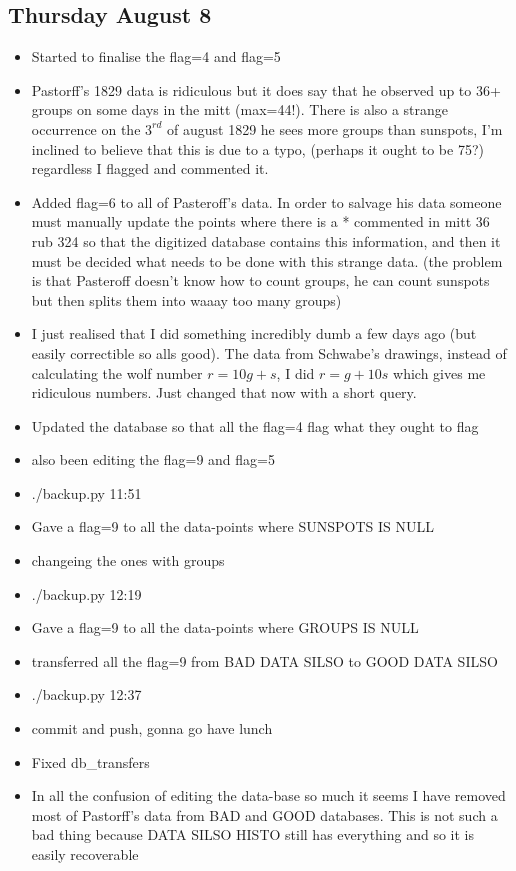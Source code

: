 \documentclass[12pt]{article}
\begin{document}
\subsection{Thursday August 8}
\begin{itemize}
    \item Started to finalise the flag=4 and flag=5
    \item Pastorff's 1829 data is ridiculous but it does say that he observed up to 36+ groups on some days in the mitt (max=44!). There is also a strange occurrence on the $3^{rd}$ of august 1829 he sees more groups than sunspots, I'm inclined to believe that this is due to a typo, (perhaps it ought to be 75?) regardless I flagged and commented it.
    \item Added flag=6 to all of Pasteroff's data. In order to salvage his data someone must manually update the points where there is a * commented in mitt 36 rub 324 so that the digitized database contains this information, and then it must be decided what needs to be done with this strange data. (the problem is that Pasteroff doesn't know how to count groups, he can count sunspots but then splits them into waaay too many groups)
    \item I just realised that I did something incredibly dumb a few days ago (but easily correctible so alls good). The data from Schwabe's drawings, instead of calculating the wolf number $r = 10g + s$, I did $r = g + 10s$ which gives me ridiculous numbers. Just changed that now with a short query.
    \item Updated the database so that all the flag=4 flag what they ought to flag
    \item also been editing the flag=9 and flag=5
    \item ./backup.py 11:51
    \item Gave a flag=9 to all the data-points where SUNSPOTS IS NULL
    \item changeing the ones with groups
    \item ./backup.py 12:19
    \item Gave a flag=9 to all the data-points where GROUPS IS NULL
    \item transferred all the flag=9 from BAD DATA SILSO to GOOD DATA SILSO
    \item ./backup.py 12:37
    \item commit and push, gonna go have lunch
    \item Fixed db\_transfers
    \item In all the confusion of editing the data-base so much it seems I have removed most of Pastorff's data from BAD and GOOD databases. This is not such a bad thing because DATA SILSO HISTO still has everything and so it is easily recoverable

\end{itemize}
\end{document}
